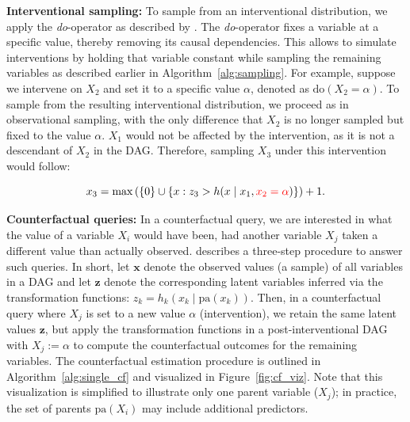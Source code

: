 % 



\textbf{Interventional sampling:} To sample from an interventional distribution, we apply the \textit{do}-operator as described by \citet{pearl1995}. The \textit{do}-operator fixes a variable at a specific value, thereby removing its causal dependencies. This allows to simulate interventions by holding that variable constant while sampling the remaining variables as described earlier in Algorithm~\ref{alg:sampling}. For example, suppose we intervene on $X_2$ and set it to a specific value $\alpha$, denoted as $\text{do}(X_2 = \alpha)$. To sample from the resulting interventional distribution, we proceed as in observational sampling, with the only difference that $X_2$ is no longer sampled but fixed to the value $\alpha$. $X_1$ would not be affected by the intervention, as it is not a descendant of $X_2$ in the DAG. Therefore, sampling $X_3$ under this intervention would follow:

\[
x_3 = \max \left( \{0\} \cup \left\{ x : z_3 > h(x \mid x_1, \textcolor{red}{x_2 = \alpha}) \right\} \right) + 1.
\]


\textbf{Counterfactual queries:} In a counterfactual query, we are interested in what the value of a variable $X_i$ would have been, had another variable $X_j$ taken a different value than actually observed. \citet{pearl_book2009} describes a three-step procedure to answer such queries. In short, let $\mathbf{x}$ denote the observed values (a sample) of all variables in a DAG and let $\mathbf{z}$ denote the corresponding latent variables inferred via the transformation functions: $z_k = h_k(x_k \mid \text{pa}(x_k))$. Then, in a counterfactual query where $X_j$ is set to a new value $\alpha$ (intervention), we retain the same latent values $\mathbf{z}$, but apply the transformation functions in a post-interventional DAG with $X_j := \alpha$ to compute the counterfactual outcomes for the remaining variables.
The counterfactual estimation procedure is outlined in Algorithm~\ref{alg:single_cf} and visualized in Figure~\ref{fig:cf_viz}. Note that this visualization is simplified to illustrate only one parent variable ($X_j$); in practice, the set of parents $\text{pa}(X_i)$ may include additional predictors.

